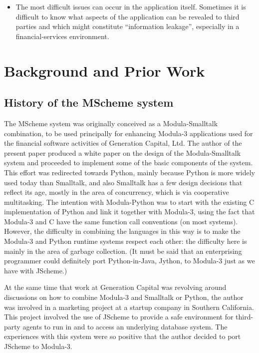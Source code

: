 \begin{itemize}
\item The most difficult issues can occur in the application itself.
  Sometimes it is difficult to know what aspects of the application
  can be revealed to third parties and which might constitute
  ``information leakage'', especially in a financial-services
  environment.

\end{itemize}


\section{Background and Prior Work}\label{sec:prior_work}

\subsection{History of the MScheme system}

The MScheme system was originally conceived as a Modula-Smalltalk
combination, to be used principally for enhancing Modula-3
applications used for the financial software activities of Generation
Capital, Ltd.  The author of the present paper produced a white paper
on the design of the Modula-Smalltalk system and proceeded to
implement some of the basic components of the system.  This effort was
redirected towards Python, mainly because Python is more widely used
today than Smalltalk, and also Smalltalk has a few design decisions
that reflect its age, mostly in the area of concurrency, which is via
cooperative multitasking.  The intention with Modula-Python was to
start with the existing C implementation of Python and link it
together with Modula-3, using the fact that Modula-3 and C have the
same function call conventions (on most systems).  However, the
difficulty in combining the languages in this way is to make the
Modula-3 and Python runtime systems respect each other: the difficulty
here is mainly in the area of garbage collection.  (It must be said
that an enterprising programmer could definitely port Python-in-Java,
Jython, to Modula-3 just as we have with JScheme.)  

At the same time that work at Generation Capital was revolving around
discussions on how to combine Modula-3 and Smalltalk or Python, the
author was involved in a marketing project at a startup company
in Southern California.  This project involved the use of JScheme to
provide a safe environment for third-party agents to run in and to
access an underlying database system.  The experiences with this system
were so positive that the author decided to port JScheme to Modula-3.

